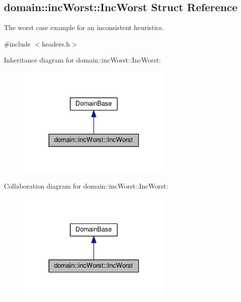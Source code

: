 \hypertarget{structdomain_1_1incWorst_1_1IncWorst}{}\subsection{domain\+:\+:inc\+Worst\+:\+:Inc\+Worst Struct Reference}
\label{structdomain_1_1incWorst_1_1IncWorst}


The worst case example for an inconsistent heuristics.  




{\ttfamily \#include $<$headers.\+h$>$}



Inheritance diagram for domain\+:\+:inc\+Worst\+:\+:Inc\+Worst\+:\nopagebreak
\begin{figure}[H]
\begin{center}
\leavevmode
\includegraphics[width=219pt]{structdomain_1_1incWorst_1_1IncWorst__inherit__graph}
\end{center}
\end{figure}


Collaboration diagram for domain\+:\+:inc\+Worst\+:\+:Inc\+Worst\+:\nopagebreak
\begin{figure}[H]
\begin{center}
\leavevmode
\includegraphics[width=219pt]{structdomain_1_1incWorst_1_1IncWorst__coll__graph}
\end{center}
\end{figure}
